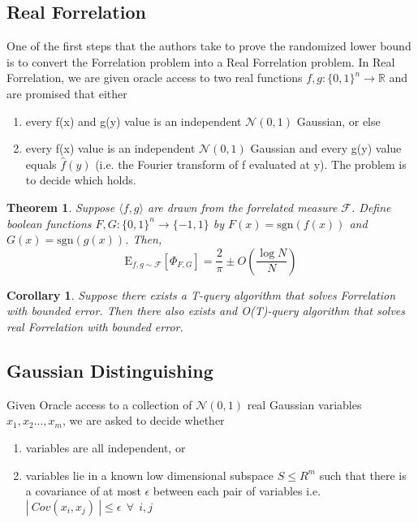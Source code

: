 \documentclass[12pt]{report}
\newtheorem{theorem}{Theorem}
\newtheorem*{corollary}{Corollary}
\newcommand{\sgn}{\mathrm{sgn}}
\begin{document}
\subsection{Real Forrelation}
One of the first steps that the authors take to prove the randomized lower bound is to convert the Forrelation problem into a Real Forrelation problem. In Real Forrelation, we are given oracle access to two real functions $f,g\colon \{0,1\}^{n}\rightarrow \mathbb{R}$ and are promised that either
\begin{enumerate}
\item every f(x) and g(y) value is an independent $\mathcal{N}(0,1)$ Gaussian, or else
\item every f(x) value is an independent $\mathcal{N}(0,1)$ Gaussian and every g(y) value equals $\hat{f}(y)$ (i.e. the Fourier transform of f evaluated at y).
The problem is to decide which holds.
\end{enumerate}

\begin{theorem}
Suppose $\langle f, g\rangle$ are drawn from the forrelated measure $\mathcal{F}$. Define boolean functions $F,G\colon \{0,1\}^{n} \rightarrow \{-1,1\}$ by $F(x) = \sgn(f(x))$ and $G(x) = \sgn(g(x))$. Then,
\begin{equation}
\mathrm{E}_{f, g \sim \mathcal{F}}\left[\Phi_{F, G}\right]=\frac{2}{\pi} \pm O\left(\frac{\log N}{N}\right)
\end{equation}
\end{theorem}

\begin{corollary}
Suppose there exists a T-query algorithm that solves Forrelation with bounded error. Then there also exists and O(T)-query algorithm that solves real Forrelation with bounded error.
\end{corollary}

\subsection{Gaussian Distinguishing}
Given Oracle access to a collection of $\mathcal{N}(0,1)$ real Gaussian variables $x_{1},x_{2}..., x_{m}$, we are asked to decide whether 
\begin{enumerate}
\item variables are all independent, or
\item variables lie in a known low dimensional subspace $S \leq R^{m}$ such that there is a covariance of at most $\epsilon$ between each pair of variables i.e.  $ |~Cov(x_{i},x_{j})~| \leq \epsilon~~ \forall~~ i,j$
\end{enumerate}
\end{document}
